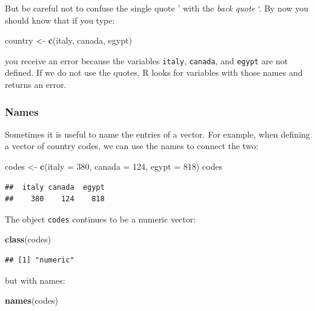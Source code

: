 \documentclass[
]{article}
\newenvironment{Shaded}{\begin{snugshade}}{\end{snugshade}}
\newcommand{\AttributeTok}[1]{\textcolor[rgb]{0.13,0.29,0.53}{#1}}
\newcommand{\DecValTok}[1]{\textcolor[rgb]{0.00,0.00,0.81}{#1}}
\newcommand{\FunctionTok}[1]{\textcolor[rgb]{0.13,0.29,0.53}{\textbf{#1}}}
\newcommand{\NormalTok}[1]{#1}
\newcommand{\OtherTok}[1]{\textcolor[rgb]{0.56,0.35,0.01}{#1}}
\begin{document}
But be careful not to confuse the single quote ' with the \emph{back
quote} `. By now you should know that if you type:

\begin{Shaded}
\begin{Highlighting}[]
\NormalTok{country }\OtherTok{\textless{}{-}} \FunctionTok{c}\NormalTok{(italy, canada, egypt)}
\end{Highlighting}
\end{Shaded}

you receive an error because the variables \texttt{italy},
\texttt{canada}, and \texttt{egypt} are not defined. If we do not use
the quotes, R looks for variables with those names and returns an error.

\subsubsection{Names}\label{names}

Sometimes it is useful to name the entries of a vector. For example,
when defining a vector of country codes, we can use the names to connect
the two:

\begin{Shaded}
\begin{Highlighting}[]
\NormalTok{codes }\OtherTok{\textless{}{-}} \FunctionTok{c}\NormalTok{(}\AttributeTok{italy =} \DecValTok{380}\NormalTok{, }\AttributeTok{canada =} \DecValTok{124}\NormalTok{, }\AttributeTok{egypt =} \DecValTok{818}\NormalTok{)}
\NormalTok{codes}
\end{Highlighting}
\end{Shaded}

\begin{verbatim}
##  italy canada  egypt 
##    380    124    818
\end{verbatim}

The object \texttt{codes} continues to be a numeric vector:

\begin{Shaded}
\begin{Highlighting}[]
\FunctionTok{class}\NormalTok{(codes)}
\end{Highlighting}
\end{Shaded}

\begin{verbatim}
## [1] "numeric"
\end{verbatim}

but with names:

\begin{Shaded}
\begin{Highlighting}[]
\FunctionTok{names}\NormalTok{(codes)}
\end{Highlighting}
\end{Shaded}
\end{document}
